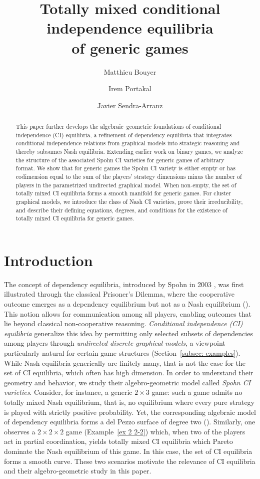 \documentclass[11pt]{amsart}
\title[{Totally mixed conditional independence equilibria of generic games}]{Totally mixed conditional independence equilibria \\ of generic games}
\author[Matthieu Bouyer]{Matthieu Bouyer}
\author[Irem Portakal]{Irem Portakal}
\author[Javier Sendra-Arranz]{Javier Sendra-Arranz}
\numberwithin{equation}{section}
\theoremstyle{plain}
\numberwithin{theorem}{section}
\theoremstyle{definition}
\begin{document}
\begin{abstract}
    This paper further develops the algebraic--geometric foundations of conditional independence (CI) equilibria, a refinement of dependency equilibria that integrates conditional independence relations from graphical models into strategic reasoning and thereby subsumes Nash equilibria. Extending earlier work on binary games, we analyze the structure of the associated Spohn CI varieties for generic games of arbitrary format. We show that for generic games the Spohn CI variety is either empty or has codimension equal to the sum of the players' strategy dimensions minus the number of players in the parametrized undirected graphical model. When non-empty, the set of totally mixed CI equilibria forms a smooth manifold for generic games. For cluster graphical models, we introduce the class of Nash CI varieties, prove their irreducibility, and describe their defining equations, degrees, and conditions for the existence of totally mixed CI equilibria for generic games.
\end{abstract}
\maketitle

\section{Introduction}
The concept of dependency equilibria, introduced by Spohn in 2003 \cite{spohn2003dependency}, was first illustrated through the classical Prisoner's Dilemma, where the cooperative outcome emerges as a dependency equilibrium but not as a Nash equilibrium (\cite{nash1950equilibrium}). This notion allows for communication among all players, enabling outcomes that lie beyond classical non-cooperative reasoning. \emph{Conditional independence (CI) equilibria} generalize this idea by permitting only selected subsets of dependencies among players through \emph{undirected discrete graphical models}, a viewpoint particularly natural for certain game structures (Section~\ref{subsec: examples}). While Nash equilibria generically are finitely many, that is not the case for the set of CI equilibria, which often has high dimension. In order to understand their geometry and behavior, we study their algebro-geometric model called \emph{Spohn CI varieties}. Consider, for instance, a generic $2 \times 3$ game: such a game admits no totally mixed Nash equilibrium, that is, no equilibrium where every pure strategy is played with strictly positive probability. Yet, the corresponding algebraic model of dependency equilibria forms a del Pezzo surface of degree two (\cite[Example 10]{portakal2022geometry}). Similarly, one observes a $2 \times 2 \times 2$ game (Example~\ref{ex 2 2-2}) which, when two of the players act in partial coordination, yields totally mixed CI equilibria which Pareto dominate the Nash equilibrium of this game. In this case, the set of CI equilibria forms a smooth curve. These two scenarios motivate the relevance of CI equilibria and their algebro-geometric study in this paper. 
\end{document}
